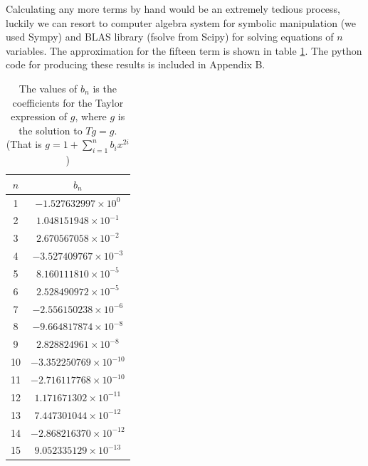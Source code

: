 Calculating any more terms by hand would be an extremely tedious process, luckily we can resort to computer algebra system for symbolic manipulation (we used Sympy) and BLAS library (fsolve from Scipy) for solving equations of $n$ variables. 
The approximation for the fifteen term is shown in table \ref{tb:b_i table}.
The python code for producing these results is included in Appendix B.

\begin{table}
\centering
\begin{tabular}{|c|c|}
\hline
$n$ & $b_n$ \\
\hline
1 & \( -1.527632997 \times 10^{0} \) \\
2 & \( 1.048151948 \times 10^{-1} \) \\
3 & \( 2.670567058 \times 10^{-2} \) \\
4 & \( -3.527409767 \times 10^{-3} \) \\
5 & \( 8.160111810 \times 10^{-5} \) \\
6 & \( 2.528490972 \times 10^{-5} \) \\
7 & \( -2.556150238 \times 10^{-6} \) \\
8 & \( -9.664817874 \times 10^{-8} \) \\
9 & \( 2.828824961 \times 10^{-8} \) \\
10 & \( -3.352250769 \times 10^{-10} \) \\
11 & \( -2.716117768 \times 10^{-10} \) \\
12 & \( 1.171671302 \times 10^{-11} \) \\
13 & \( 7.447301044 \times 10^{-12} \) \\
14 & \( -2.868216370 \times 10^{-12} \) \\
15 & \( 9.052335129 \times 10^{-13} \) \\
\hline
\end{tabular}
\caption{The values of $b_n$ is the coefficients for the Taylor expression of $g$, where $g$ is the solution to $Tg = g$.
(That is $g = 1 + \sum_{i=1}^n b_i x^{2i}$)}
\label{tb:b_i table}
\end{table}